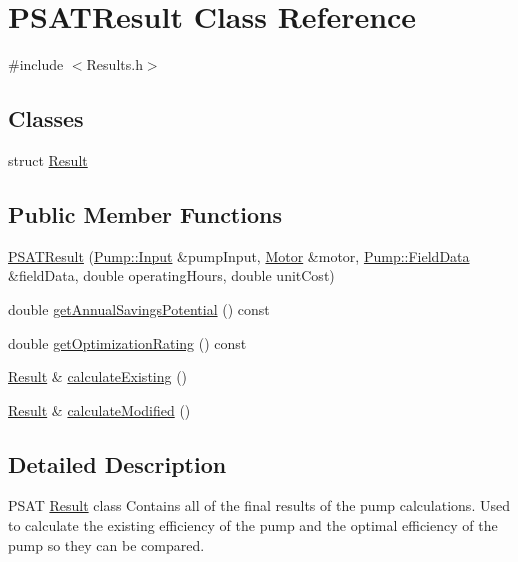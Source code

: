 \hypertarget{class_p_s_a_t_result}{}\section{P\+S\+A\+T\+Result Class Reference}
\label{class_p_s_a_t_result}


{\ttfamily \#include $<$Results.\+h$>$}

\subsection*{Classes}
\begin{DoxyCompactItemize}
\item 
struct \hyperlink{struct_p_s_a_t_result_1_1_result}{Result}
\end{DoxyCompactItemize}
\subsection*{Public Member Functions}
\begin{DoxyCompactItemize}
\item 
\hyperlink{class_p_s_a_t_result_ad876fe5e1d3da3ad28ccfb6c81f34a98}{P\+S\+A\+T\+Result} (\hyperlink{struct_pump_1_1_input}{Pump\+::\+Input} \&pump\+Input, \hyperlink{struct_motor}{Motor} \&motor, \hyperlink{struct_pump_1_1_field_data}{Pump\+::\+Field\+Data} \&field\+Data, double operating\+Hours, double unit\+Cost)
\item 
double \hyperlink{class_p_s_a_t_result_a14fc75c2e0e92f74e3df1b97ed13b496}{get\+Annual\+Savings\+Potential} () const
\item 
double \hyperlink{class_p_s_a_t_result_aa0a7001461408fcb06a6c22ce2d064db}{get\+Optimization\+Rating} () const
\item 
\hyperlink{struct_p_s_a_t_result_1_1_result}{Result} \& \hyperlink{class_p_s_a_t_result_a83e8e621cdd75e6cf2a4d3f6e48bea11}{calculate\+Existing} ()
\item 
\hyperlink{struct_p_s_a_t_result_1_1_result}{Result} \& \hyperlink{class_p_s_a_t_result_a1404ffd1e9420afd3ff4e9284d145646}{calculate\+Modified} ()
\end{DoxyCompactItemize}


\subsection{Detailed Description}
P\+S\+AT \hyperlink{struct_p_s_a_t_result_1_1_result}{Result} class Contains all of the final results of the pump calculations. Used to calculate the existing efficiency of the pump and the optimal efficiency of the pump so they can be compared. 

